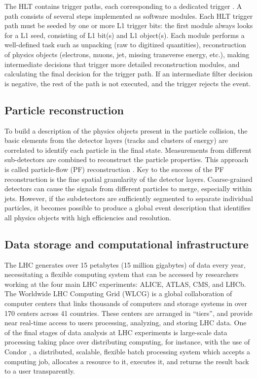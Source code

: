 The HLT contains trigger paths, each corresponding to a dedicated trigger \cite{twiki_SoftwareGuide_HLT}.  A path consists of several steps implemented as software modules. Each HLT trigger path must be seeded by one or more L1 trigger bits: the first module always looks for a L1 seed, consisting of L1 bit(s) and L1 object(s). Each module performs a well-defined task such as unpacking (raw to digitized quantities), reconstruction of physics objects (electrons, muons, jet, missing transverse energy, etc.), making intermediate decisions that trigger more detailed reconstruction modules, and calculating the final decision for the trigger path. If an intermediate filter decision is negative, the rest of the path is not executed, and the trigger rejects the event.


\subsection{Particle reconstruction}
To build a description of the physics objects present in the particle collision, the basic elements from the detector layers (tracks and clusters of energy) are correlated to identify each particle in the final state. Measurements from different sub-detectors are combined to reconstruct the particle properties. This approach is called particle-flow (PF) reconstruction \cite{CERN-EP-2017-110}. Key to the success of the PF reconstruction is the fine spatial granularity of the detector layers. Coarse-grained detectors can cause the signals from different particles to merge, especially within jets. However, if the subdetectors are sufficiently segmented to separate individual particles, it becomes possible to produce a global event description that identifies all physics objects with high efficiencies and resolution.

\subsection{Data storage and computational infrastructure}

The LHC generates over 15 petabytes (15 million gigabytes) of data every year, necessitating a flexible computing system that can be accessed by researchers working at the four main LHC experiments: ALICE, ATLAS, CMS, and LHCb. The Worldwide LHC Computing Grid (WLCG) \cite{computing-Worldwide:1997398} is a global collaboration of computer centers that links thousands of computers and storage systems in over 170 centers across 41 countries. These centers are arranged in ``tiers'', and provide near real-time access to users processing, analyzing, and storing LHC data. One of the final stages of data analysis at LHC experiments is large-scale data processing taking place over distributing computing, for instance, with the use of Condor \cite{condor-article}, a distributed, scalable, flexible batch processing system which accepts a computing job, allocates a resource to it, executes it, and returns the result back to a user transparently. 
 
